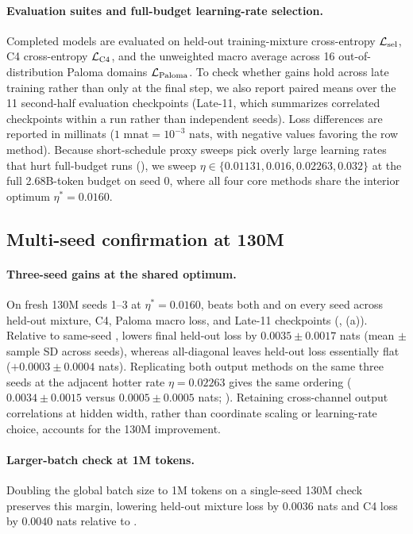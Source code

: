 \paragraph{Evaluation suites and full-budget learning-rate selection.}
Completed models are evaluated on held-out training-mixture cross-entropy $\mathcal{L}_{\mathrm{sel}}$, C4 cross-entropy $\mathcal{L}_{\mathrm{C4}}$, and the unweighted macro average across 16 out-of-distribution Paloma domains $\mathcal{L}_{\mathrm{Paloma}}$. To check whether gains hold across late training rather than only at the final step, we also report paired means over the 11 second-half evaluation checkpoints (Late-11, which summarizes correlated checkpoints within a run rather than independent seeds). Loss differences are reported in millinats ($1\text{ mnat}=10^{-3}\text{ nats}$, with negative values favoring the row method). Because short-schedule proxy sweeps pick overly large learning rates that hurt full-budget runs (), we sweep $\eta\in\{0.01131,0.016,0.02263,0.032\}$ at the full 2.68B-token budget on seed 0, where all four core methods share the interior optimum $\eta^*=0.0160$.



\subsection{Multi-seed confirmation at 130M}
\label{sec:phase2}

\paragraph{Three-seed gains at the shared optimum.}
On fresh 130M seeds 1--3 at $\eta^*=0.0160$,  beats both  and  on every seed across held-out mixture, C4, Paloma macro loss, and Late-11 checkpoints (, (a)). Relative to same-seed ,  lowers final held-out loss by $0.0035\pm0.0017$ nats (mean $\pm$ sample SD across seeds), whereas all-diagonal  leaves held-out loss essentially flat ($+0.0003\pm0.0004$ nats). Replicating both output methods on the same three seeds at the adjacent hotter rate $\eta=0.02263$ gives the same ordering ($0.0034\pm0.0015$ versus $0.0005\pm0.0005$ nats; ). Retaining cross-channel output correlations at hidden width, rather than coordinate scaling or learning-rate choice, accounts for the 130M improvement.

\paragraph{Larger-batch check at 1M tokens.}
Doubling the global batch size to 1M tokens on a single-seed 130M check preserves this margin, lowering held-out mixture loss by $0.0036$ nats and C4 loss by $0.0040$ nats relative to .

